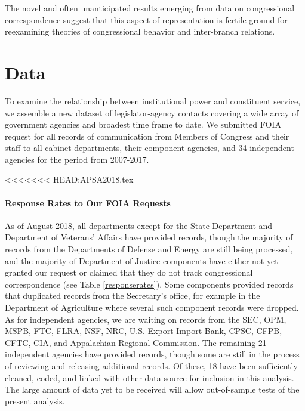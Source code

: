 \documentclass{article}
\begin{document}
The novel and often unanticipated results emerging from data on congressional correspondence suggest that this aspect of representation is fertile ground for reexamining theories of congressional behavior and inter-branch relations. 




\section{Data} 
To examine the relationship between institutional power and constituent service, we assemble a new dataset of legislator-agency contacts covering a wide array of government agencies and broadest time frame to date. We submitted FOIA request for all records of communication from Members of Congress and their staff to all cabinet departments, their component agencies, and 34 independent agencies for the period from 2007-2017.

<<<<<<< HEAD:APSA2018.tex
\paragraph{Response Rates to Our FOIA Requests} As of August 2018, all departments except for the State Department and Department of Veterans' Affairs have provided records, though the majority of records from the Departments of Defense and Energy are still being processed, and the majority of Department of Justice components have either not yet granted our request or claimed that they do not track congressional correspondence (see Table \ref{responserates}). Some components provided records that duplicated records from the Secretary's office, for example in the Department of Agriculture where several such component records were dropped. As for independent agencies, we are waiting on records from the SEC, OPM, MSPB, FTC, FLRA, NSF, NRC, U.S. Export-Import Bank, CPSC, CFPB, CFTC, CIA, and Appalachian Regional Commission. The remaining 21 independent agencies have provided records, though some are still in the process of reviewing and releasing additional records. Of these, 18 have been sufficiently cleaned, coded, and linked with other data source for inclusion in this analysis. The large amount of data yet to be received will allow out-of-sample tests of the present analysis. 
\end{document}
